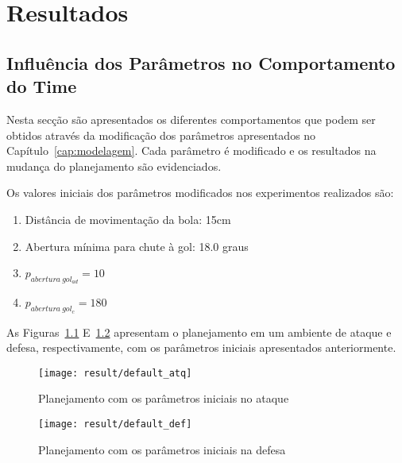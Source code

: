 \chapter{Resultados}\label{cap:resultados}



\section{Influência dos Parâmetros no Comportamento do Time}

Nesta secção são apresentados os diferentes comportamentos
que podem ser obtidos através da modificação dos parâmetros
apresentados no Capítulo~\ref{cap:modelagem}. Cada parâmetro
é modificado e os resultados na mudança do planejamento são
evidenciados.

Os valores iniciais dos parâmetros modificados nos experimentos
realizados são:

\begin{enumerate}
  \item Distância de movimentação da bola: 15cm
  \item Abertura mínima para chute à gol: 18.0 graus
  \item $p_{abertura{\ }gol_{ad}} = 10$
  \item $p_{abertura{\ }gol_{c}} = 180$
\end{enumerate}

As Figuras~\ref{fig:default_atq} E~\ref{fig:default_def} apresentam
o planejamento em um ambiente de ataque e defesa, respectivamente,
com os parâmetros iniciais apresentados anteriormente.

\begin{figure}[H]
  \centering
  \texttt{[image: result/default\_atq]}
  \caption{Planejamento com os parâmetros iniciais no
           ataque}\label{fig:default_atq}
\end{figure}
\begin{figure}[H]
  \centering
  \texttt{[image: result/default\_def]}
  \caption{Planejamento com os parâmetros iniciais
           na defesa}\label{fig:default_def}
\end{figure}

